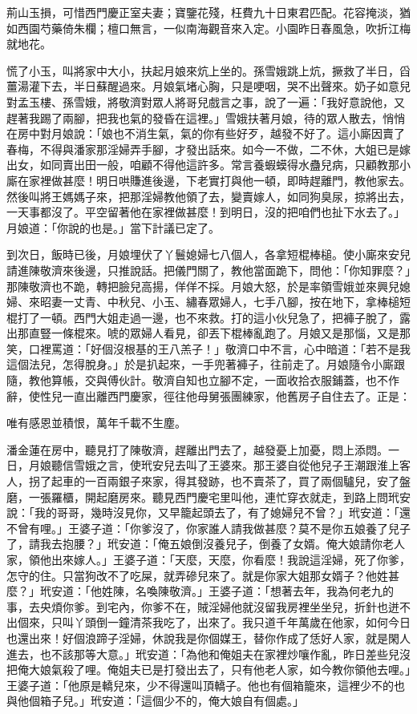 荊山玉損，可惜西門慶正室夫妻；寶鑒花殘，枉費九十日東君匹配。花容掩淡，猶如西園芍藥倚朱欄；檀口無言，一似南海觀音來入定。小園昨日春風急，吹折江梅就地花。

慌了小玉，叫將家中大小，扶起月娘來炕上坐的。孫雪娥跳上炕，撅救了半日，舀薑湯灌下去，半日蘇醒過來。月娘氣堵心胸，只是哽咽，哭不出聲來。奶子如意兒對孟玉樓、孫雪娥，將敬濟對眾人將哥兒戲言之事，說了一遍：「我好意說他，又趕著我踢了兩腳，把我也氣的發昏在這裡。」雪娥扶著月娘，待的眾人散去，悄悄在房中對月娘說：「娘也不消生氣，氣的你有些好歹，越發不好了。這小廝因賣了春梅，不得與潘家那淫婦弄手腳，才發出話來。如今一不做，二不休，大姐已是嫁出女，如同賣出田一般，咱顧不得他這許多。常言養蝦蟆得水蠱兒病，只顧教那小廝在家裡做甚麼！明日哄賺進後邊，下老實打與他一頓，即時趕離門，教他家去。然後叫將王媽媽子來，把那淫婦教他領了去，變賣嫁人，如同狗臭尿，掠將出去，一天事都沒了。平空留著他在家裡做甚麼！到明日，沒的把咱們也扯下水去了。」 月娘道：「你說的也是。」當下計議已定了。

到次日，飯時已後，月娘埋伏了丫鬟媳婦七八個人，各拿短棍棒槌。使小廝來安兒請進陳敬濟來後邊，只推說話。把儀門關了，教他當面跪下，問他：「你知罪麼？」那陳敬濟也不跪，轉把臉兒高揚，佯佯不採。月娘大怒，於是率領雪娥並來興兒媳婦、來昭妻一丈青、中秋兒、小玉、繡春眾婦人，七手八腳，按在地下，拿棒槌短棍打了一頓。西門大姐走過一邊，也不來救。打的這小伙兒急了，把褲子脫了，露出那直豎一條棍來。唬的眾婦人看見，卻丟下棍棒亂跑了。月娘又是那惱，又是那笑，口裡罵道：「好個沒根基的王八羔子！」敬濟口中不言，心中暗道：「若不是我這個法兒，怎得脫身。」於是扒起來，一手兜著褲子，往前走了。月娘隨令小廝跟隨，教他算帳，交與傅伙計。敬濟自知也立腳不定，一面收拾衣服鋪蓋，也不作辭，使性兒一直出離西門慶家，徑往他母舅張團練家，他舊房子自住去了。正是：

唯有感恩並積恨，萬年千載不生塵。

潘金蓮在房中，聽見打了陳敬濟，趕離出門去了，越發憂上加憂，悶上添悶。一日，月娘聽信雪娥之言，使玳安兒去叫了王婆來。那王婆自從他兒子王潮跟淮上客人，拐了起車的一百兩銀子來家，得其發跡，也不賣茶了，買了兩個驢兒，安了盤磨，一張羅櫃，開起磨房來。聽見西門慶宅里叫他，連忙穿衣就走，到路上問玳安說：「我的哥哥，幾時沒見你，又早籠起頭去了，有了媳婦兒不曾？」玳安道：「還不曾有哩。」王婆子道：「你爹沒了，你家誰人請我做甚麼？莫不是你五娘養了兒子了，請我去抱腰？」玳安道：「俺五娘倒沒養兒子，倒養了女婿。俺大娘請你老人家，領他出來嫁人。」王婆子道：「天麼，天麼，你看麼！我說這淫婦，死了你爹，怎守的住。只當狗改不了吃屎，就弄磣兒來了。就是你家大姐那女婿子？他姓甚麼？」玳安道：「他姓陳，名喚陳敬濟。」王婆子道：「想著去年，我為何老九的事，去央煩你爹。到宅內，你爹不在，賊淫婦他就沒留我房裡坐坐兒，折針也迸不出個來，只叫丫頭倒一鐘清茶我吃了，出來了。我只道千年萬歲在他家，如何今日也還出來！好個浪蹄子淫婦，休說我是你個媒王，替你作成了恁好人家，就是閑人進去，也不該那等大意。」玳安道：「為他和俺姐夫在家裡炒嚷作亂，昨日差些兒沒把俺大娘氣殺了哩。俺姐夫已是打發出去了，只有他老人家，如今教你領他去哩。」王婆子道：「他原是轎兒來，少不得還叫頂轎子。他也有個箱籠來，這裡少不的也與他個箱子兒。」玳安道：「這個少不的，俺大娘自有個處。」

